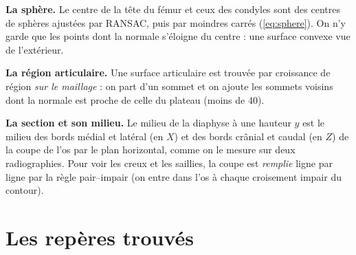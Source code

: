 \textbf{La sphère.} Le centre de la tête du fémur et ceux des condyles sont des centres de sphères ajustées par RANSAC,
puis par moindres carrés (\cref{eq:sphere}). On n'y garde que les points dont la normale s'éloigne du centre : une
surface convexe vue de l'extérieur.

\textbf{La région articulaire.} Une surface articulaire est trouvée par croissance de région \emph{sur le maillage} :
on part d'un sommet et on ajoute les sommets voisins dont la normale est proche de celle du plateau (moins de 40\degre).

\textbf{La section et son milieu.} Le milieu de la diaphyse à une hauteur $y$ est le milieu des bords médial et latéral
(en $X$) et des bords crânial et caudal (en $Z$) de la coupe de l'os par le plan horizontal, comme on le mesure sur deux
radiographies. Pour voir les creux et les saillies, la coupe est \emph{remplie} ligne par ligne par la règle
pair--impair (on entre dans l'os à chaque croisement impair du contour).

\section{Les repères trouvés}


